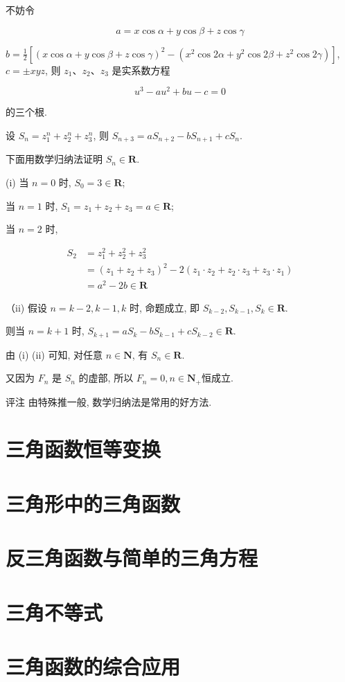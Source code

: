 	不妨令

	$$
		a=x \cos \alpha+y \cos \beta+z \cos \gamma
	$$

$b=\frac{1}{2}\left[(x \cos \alpha+y \cos \beta+z \cos \gamma)^{2}-\left(x^{2} \cos 2 \alpha+y^{2} \cos 2 \beta+z^{2} \cos 2 \gamma\right)\right]$, $c= \pm x y z$, 则 $z_{1} 、 z_{2} 、 z_{3}$ 是实系数方程

	$$
		u^{3}-a u^{2}+b u-c=0
	$$

	的三个根.

	设 $S_{n}=z_{1}^{n}+z_{2}^{n}+z_{3}^{n}$, 则 $S_{n+3}=a S_{n+2}-b S_{n+1}+c S_{n}$.

	下面用数学归纳法证明 $S_{n} \in \mathbf{R}$.

	(i) 当 $n=0$ 时, $S_{0}=3 \in \mathbf{R}$;

	当 $n=1$ 时, $S_{1}=z_{1}+z_{2}+z_{3}=a \in \mathbf{R}$;

	当 $n=2$ 时,

	$$
		\begin{aligned}
			S_{2} & =z_{1}^{2}+z_{2}^{2}+z_{3}^{2}                                                                          \\
			      & =\left(z_{1}+z_{2}+z_{3}\right)^{2}-2\left(z_{1} \cdot z_{2}+z_{2} \cdot z_{3}+z_{3} \cdot z_{1}\right) \\
			      & =a^{2}-2 b \in \mathbf{R}
		\end{aligned}
	$$

	（ii) 假设 $n=k-2, k-1, k$ 时, 命题成立, 即 $S_{k-2}, S_{k-1}, S_{k} \in \mathbf{R}$.

	则当 $n=k+1$ 时, $S_{k+1}=a S_{k}-b S_{k-1}+c S_{k-2} \in \mathbf{R}$.

	由 (i) (ii) 可知, 对任意 $n \in \mathbf{N}$, 有 $S_{n} \in \mathbf{R}$.

	又因为 $F_{n}$ 是 $S_{n}$ 的虚部, 所以 $F_{n}=0, n \in \mathbf{N}_{+}$恒成立.

评注 由特殊推一般, 数学归纳法是常用的好方法.



\section{三角函数恒等变换}
\section{三角形中的三角函数}
\section{反三角函数与简单的三角方程}
\section{三角不等式}
\section{三角函数的综合应用}